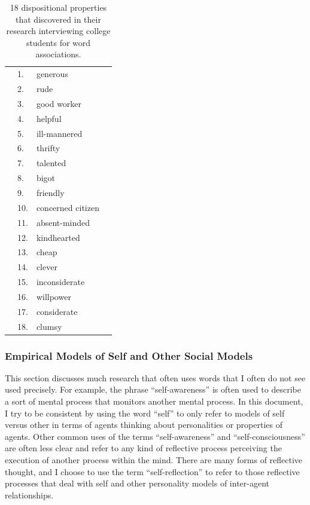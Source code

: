 \begin{table}
  \myfloatalign
  \begin{tabularx}{\textwidth}{XllX}
    & 1.  & generous          & \\
    & 2.  & rude              & \\
    & 3.  & good worker       & \\
    & 4.  & helpful           & \\
    & 5.  & ill-mannered      & \\
    & 6.  & thrifty           & \\
    & 7.  & talented          & \\
    & 8.  & bigot             & \\
    & 9.  & friendly          & \\
    & 10. & concerned citizen & \\
    & 11. & absent-minded     & \\
    & 12. & kindhearted       & \\
    & 13. & cheap             & \\
    & 14. & clever            & \\
    & 15. & inconsiderate     & \\
    & 16. & willpower         & \\
    & 17. & considerate       & \\
    & 18. & clumsy            & 
  \end{tabularx}
  \caption[18 dispositional properties]{18 dispositional properties
    that  discovered in their research
    interviewing college students for word associations.}
  \label{tab:winter_dispositional_properties}
\end{table}


\subsubsection{Empirical Models of Self and Other Social Models}

This section discusses much research that often uses words that I often do not see used precisely.
For example, the phrase ``self-awareness'' is often used to describe a sort of mental process that monitors another mental process.
In this document, I try to be consistent by using the word ``self'' to only refer to models of self versus other in terms of agents thinking about personalities or properties of agents.
Other common uses of the terms ``self-awareness'' and ``self-consciousness'' are often less clear and refer to any kind of reflective process perceiving the execution of another process within the mind.
There are many forms of reflective thought, and I choose to use the term ``self-reflection'' to refer to those reflective processes that deal with self and other personality models of inter-agent relationships.

